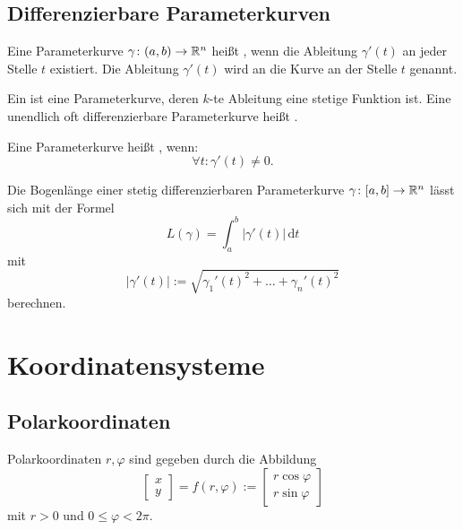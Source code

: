 \subsection{Differenzierbare Parameterkurven}

\begin{definition}
Eine Parameterkurve $\gamma\colon (a,b)\to\mathbb R^n$ heißt
, wenn die Ableitung $\gamma'(t)$ an jeder Stelle
$t$ existiert. Die Ableitung $\gamma'(t)$ wird
 an die Kurve an der Stelle $t$ genannt.

Ein  ist eine Parameterkurve, deren $k$-te Ableitung
eine stetige Funktion ist. Eine unendlich oft differenzierbare
Parameterkurve heißt .

Eine Parameterkurve heißt , wenn:
\begin{equation}
\forall t\colon \gamma'(t)\ne 0.
\end{equation}
\end{definition}

\noindent
{} Die Bogenlänge einer stetig differenzierbaren
Parameterkurve $\gamma\colon [a,b]\to\mathbb R^n$ lässt sich mit
der Formel
\begin{equation}
L(\gamma) = \int_a^b |\gamma'(t)|\,\mathrm dt
\end{equation}
mit
\begin{equation}
|\gamma'(t)| := \sqrt{\gamma_1'(t)^2+\ldots+\gamma_n'(t)^2}
\end{equation}
berechnen.

\section{Koordinatensysteme}
\subsection{Polarkoordinaten}
Polarkoordinaten $r,\varphi$ sind gegeben durch
die Abbildung%
\begin{equation}
\begin{bmatrix}x\\ y\end{bmatrix}
=f(r,\varphi)
:=\begin{bmatrix}
r\cos\varphi\\
r\sin\varphi
\end{bmatrix}
\end{equation}
mit $r>0$ und $0\le\varphi<2\pi$.

